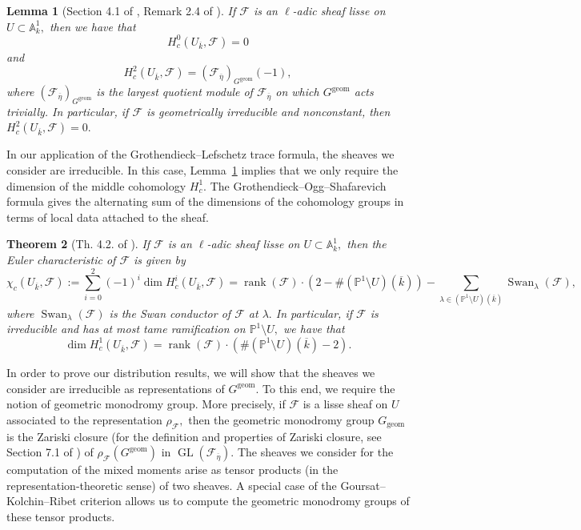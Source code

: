 \documentclass[12pt]{amsart}
\newtheorem{theorem}{Theorem}[section]
\newtheorem{lemma}[theorem]{Lemma}
\theoremstyle{definition}
\theoremstyle{remark}
\numberwithin{equation}{section}
\def\A{\mathbb A}
\DeclareMathOperator{\rank}{rank}
\DeclareMathOperator{\geom}{geom}
\DeclareMathOperator{\GL}{GL}
\DeclareMathOperator{\Swan}{Swan}
\begin{document}
\begin{lemma}[Section 4.1 of \cite{AppliedladicCohomology}, Remark 2.4 of \cite{ECMilneBook}]\label{extremalCohomologyDescription}
    If $\mathcal{F}$ is an $\ell$-adic sheaf lisse on $U\subset\A_{k}^1,$ then we have that
    $$
    H_c^0(U_{\overline{k}},\mathcal{F}) = 0
    $$
    and 
    $$
    H_c^2(U_{\overline{k}},\mathcal{F}) = (\mathcal{F}_{\overline{\eta}})_{G^{\geom}}(-1),
    $$
    where $(\mathcal{F}_{\overline{\eta}})_{G^{\geom}}$ is the largest quotient module of $\mathcal{F}_{\overline{\eta}}$ on which $G^{\geom}$ acts trivially. In particular, if $\mathcal{F}$ is geometrically irreducible and nonconstant, then $H_c^2(U_{\overline{k}},\mathcal{F})=0.$
\end{lemma}

In our application of the Grothendieck--Lefschetz trace formula, the sheaves we consider are irreducible. In this case, Lemma~\ref{extremalCohomologyDescription} implies that we only require the dimension of the middle cohomology $H_c^1.$ The Grothendieck--Ogg--Shafarevich formula gives the alternating sum of the dimensions of the cohomology groups in terms of local data attached to the sheaf.

\begin{theorem}[Th. 4.2. of \cite{AppliedladicCohomology}]\label{EulerChar}
    If $\mathcal{F}$ is an $\ell$-adic sheaf lisse on $U\subset\A_{k}^1,$ then the Euler characteristic of $\mathcal{F}$ is given by
    $$
    \chi_c(U_{\overline{k}},\mathcal{F}):=\sum\limits_{i=0}^2(-1)^i\dim H_c^{i}(U_{\overline{k}},\mathcal{F}) = \rank(\mathcal{F})\cdot(2-\#(\mathbb{P}^1\setminus U)(\overline{k})) - \sum\limits_{\lambda\in(\mathbb{P}^1\setminus U)(\overline{k})}\Swan_\lambda(\mathcal{F}),
    $$
    where $\Swan_\lambda(\mathcal{F})$ is the Swan conductor of $\mathcal{F}$ at $\lambda.$ In particular, if $\mathcal{F}$ is irreducible and has at most tame ramification on $\mathbb{P}^1\setminus U,$ we have that
    $$
    \dim H_c^1(U_{\overline{k}},\mathcal{F})=\rank(\mathcal{F})\cdot (\#(\mathbb{P}^1\setminus U)(\overline{k})-2).
    $$
\end{theorem}


In order to prove our distribution results, we will show that the sheaves we consider are irreducible as representations of $G^{\geom}.$ To this end, we require the notion of geometric monodromy group. More precisely, if $\mathcal{F}$ is a lisse sheaf on $U$ associated to the representation $\rho_\mathcal{F},$ then the geometric monodromy group $G_{\geom}$ is the Zariski closure (for the definition and properties of Zariski closure, see Section 7.1 of \cite{KowalskiRep}) of $\rho_{\mathcal{F}}(G^{\geom})$ in $\GL(\mathcal{F}_{\overline{\eta}}).$ The sheaves we consider for the computation of the mixed moments arise as tensor products (in the representation-theoretic sense) of two sheaves. A special case of the Goursat--Kolchin--Ribet criterion allows us to compute the geometric monodromy groups of these tensor products.
\end{document}
